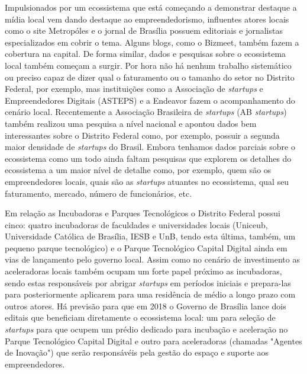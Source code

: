 Impulsionados por um ecossistema que está começando a demonstrar destaque a mídia local vem dando destaque ao empreendedorismo, influentes atores locais como o site Metropóles e o jornal de Brasília possuem editoriais e jornalistas especializados em cobrir o tema. Alguns blogs, como o Bizmeet, também fazem a cobertura na capital. De forma similar, dados e pesquisas sobre o ecossistema local também começam a surgir. Por hora não há nenhum trabalho sistemático ou preciso capaz de dizer qual o faturamento ou o tamanho do setor no Distrito Federal, por exemplo, mas instituições como a Associação de \textit{startups} e Empreendedores Digitais (ASTEPS) e a Endeavor fazem o acompanhamento do cenário local. Recentemente a Associação Brasileira de \textit{startups} (AB \textit{startups}) também realizou uma pesquisa a nível nacional e apontou dados bem interessantes sobre o Distrito Federal como, por exemplo, possuir a segunda maior densidade de \textit{startups} do Brasil. Embora tenhamos dados parciais sobre o ecossistema como um todo ainda faltam pesquisas que explorem os detalhes do ecossistema a um maior nível de detalhe como, por exemplo, quem são os empreendedores locais, quais são as \textit{startups} atuantes no ecossistema, qual seu faturamento, mercado, número de funcionários, etc.

Em relação as Incubadoras e Parques Tecnológicos o Distrito Federal possui cinco: quatro incubadoras de faculdades e universidades locais (Uniceub, Universidade Católica de Brasília, IESB e UnB, tendo esta última, também, um pequeno parque tecnológico) e o Parque Tecnológico Capital Digital ainda em vias de lançamento pelo governo local. Assim como no cenário de investimento as aceleradoras locais também ocupam um forte papel próximo as incubadoras, sendo estas responsáveis por abrigar \textit{startups} em períodos iniciais e prepara-las para posteriormente aplicarem para uma residência de médio a longo prazo com outros atores. Há previsão para que em 2018 o Governo de Brasília lance dois editais que beneficiam diretamente o ecossistema local: um para seleção de \textit{startups} para que ocupem um prédio dedicado para incubação e aceleração no Parque Tecnológico Capital Digital e outro para aceleradoras (chamadas "Agentes de Inovação") que serão responsávéis pela gestão do espaço e suporte aos empreendedores.

